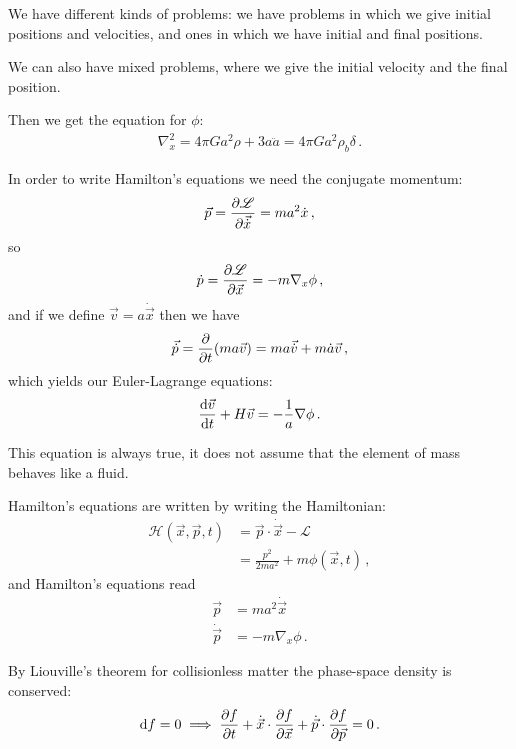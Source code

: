 \documentclass[main.tex]{subfiles}
\begin{document}
We have different kinds of problems: we have problems in which we give initial positions and velocities, and ones in which we have initial and final positions. 

We can also have mixed problems, where we give the initial velocity and the final position.


Then we get the equation for \(\phi \): 
%
\begin{align}
\nabla^2_{x} = 4 \pi G a^2 \rho + 3 a \ddot{a} = 4 \pi G a^2\rho_{b} \delta 
\,.
\end{align}

In order to write Hamilton's equations we need the conjugate momentum: 
%
\begin{align}
\vec{p} = \pdv{\mathscr{L}}{\vec{\dot{x}}} = m a^2 \dot{x}
\,,
\end{align}
%
so 
%
\begin{align}
\dot{p} = \pdv{\mathscr{L}}{\vec{x}} = - m \nabla_{x} \phi 
\,,
\end{align}
%
and if we define \(\vec{v} = a \dot{\vec{x}}\) then we have 
%
\begin{align}
\vec{\dot{p}} = \pdv{}{t} \qty(m a \vec{v}) = m a \vec{\dot{v}} + m \dot{a} \vec{v}
\,,
\end{align}
%
which yields our Euler-Lagrange equations: 
%
\begin{align}
\dv{\vec{v}}{t} + H \vec{v} = - \frac{1}{a} \nabla \phi 
\,.
\end{align}

This equation is always true, it does not assume that the element of mass behaves like a fluid. 

Hamilton's equations are written by writing the Hamiltonian: 
%
\begin{align}
\mathscr{H}(\vec{x}, \vec{p}, t) &= \vec{p} \cdot \dot{\vec{x}} - \mathscr{L}   \\
&= \frac{p^2}{2 m a^2} + m \phi (\vec{x}, t)
\,,
\end{align}
%
and Hamilton's equations read 
%
\begin{align}
\vec{p} &= m a^2 \dot{\vec{x}}  \\
\dot{\vec{p}} &= - m \nabla_{x} \phi 
\,.
\end{align}

By Liouville's theorem for collisionless matter the phase-space density is conserved: 
%
\begin{align}
\dd{f} = 0 \implies 
\pdv{f}{t} + \dot{\vec{x}} \cdot \pdv{f}{\vec{x}} + \dot{\vec{p}} \cdot \pdv{f}{\vec{p}} = 0
\,.
\end{align}
\end{document}
